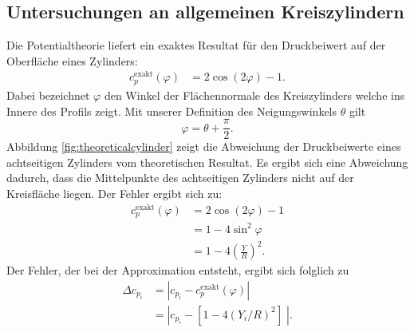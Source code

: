 \subsection{Untersuchungen an allgemeinen Kreiszylindern} \label{chap:analyticalcylinder}
Die Potentialtheorie liefert ein exaktes Resultat für den Druckbeiwert auf der Oberfläche eines Zylinders: \cite{Cebeci:1999}
\begin{align}
c_p^\mathrm{exakt} (\varphi ) &=  2 \cos{(2\varphi )} -1.
\end{align}
Dabei bezeichnet $\varphi$ den Winkel der Flächennormale des Kreiszylinders welche ins Innere des Profils zeigt. Mit unserer Definition des Neigungswinkels $\theta$ gilt
\begin{equation}
\varphi = \theta +  \frac{\pi }{2}.
\end{equation}
Abbildung \ref{fig:theoreticalcylinder} zeigt die Abweichung der Druckbeiwerte eines achtseitigen Zylinders vom theoretischen Resultat. Es ergibt sich eine Abweichung dadurch, dass die Mittelpunkte des achtseitigen Zylinders nicht auf der Kreisfläche liegen. Der Fehler ergibt sich zu:
\begin{align}
c_p^\mathrm{exakt} (\varphi ) &=  2 \cos{(2\varphi )} -1 \\
&= 1 - 4 \sin^2 \varphi \\
&= 1 - 4 \left( \frac{Y}{R}\right)^2.
\end{align}
Der Fehler, der bei der Approximation entsteht, ergibt sich folglich zu
\begin{align}
\Delta c_{p_{i}} &= |c_{p_{i}} - c_p^\mathrm{exakt} (\varphi )| \\
&= |c_{p_{i}} -[ 1 - 4 (Y_{i}/R)^2 ] \;|.
\end{align}

